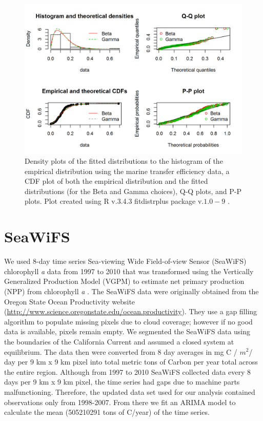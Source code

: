 \documentclass[oneside,12pt,final]{sty/ucthesis-CA2012}
\let\cite\citep                             %
\begin{document}
\begin{mainmatter}
\begin{figure}[H]
     \centering
       \includegraphics[width=.8\textwidth]{fig/gof_te}
    \caption{Density plots of the fitted distributions to the histogram of the empirical distribution using the marine transfer efficiency data, a CDF plot of both the empirical distribution and the fitted distributions (for the Beta and Gamma choices), Q-Q plots, and P-P plots. Plot created using R v.3.4.3 \cite{Rcite} fitdistrplus package v.$1.0-9$ \cite{fitdistrplus}. }
    \label{gof_te_a1}
\end{figure}

\section{SeaWiFS}
We used 8-day time series Sea-viewing Wide Field-of-view Sensor (SeaWiFS) chlorophyll \textit{a} data from 1997 to 2010 that was transformed using the Vertically Generalized Production Model (VGPM) to estimate net primary production (NPP) from chlorophyll \textit{a} \cite{behrenfeld1997photosynthetic}. The SeaWiFS data were originally obtained from the Oregon State Ocean Productivity website (\url{http://www.science.oregonstate.edu/ocean.productivity}). They use a gap filling algorithm to populate missing pixels due to cloud coverage; however if no good data is available, pixels remain empty. We segmented the SeaWiFS data using the boundaries of the California Current and assumed a closed system at equilibrium. The data then were converted from 8 day averages in mg C / $m^2 $/ day per 9 km x 9 km pixel into total metric tons of Carbon per year total across the entire region. Although from 1997 to 2010 SeaWiFS collected data every 8 days per 9 km x 9 km pixel, the time series had gaps due to machine parts malfunctioning. Therefore, the updated data set used for our analysis contained observations only from 1998-2007. From there we fit an ARIMA model to calculate the mean (505210291 tons of C/year) of the time series. 


\end{mainmatter}
\end{document}

